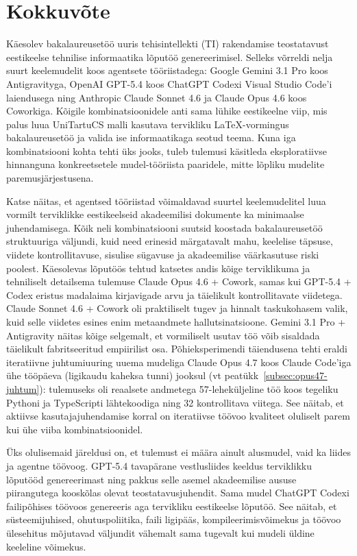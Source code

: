 \section{Kokkuvõte} \label{kokkuvote}

Käesolev bakalaureusetöö uuris tehisintellekti (TI) rakendamise teostatavust eestikeelse tehnilise informaatika lõputöö genereerimisel. Selleks võrreldi nelja suurt keelemudelit koos agentsete tööriistadega: Google Gemini 3.1 Pro koos Antigravityga, OpenAI GPT-5.4 koos ChatGPT Codexi Visual Studio Code'i laiendusega ning Anthropic Claude Sonnet 4.6 ja Claude Opus 4.6 koos Coworkiga. Kõigile kombinatsioonidele anti sama lühike eestikeelne viip, mis palus luua UniTartuCS malli kasutava tervikliku \LaTeX{}-vormingus bakalaureusetöö ja valida ise informaatikaga seotud teema. Kuna iga kombinatsiooni kohta tehti üks jooks, tuleb tulemusi käsitleda eksploratiivse hinnanguna konkreetsetele mudel-tööriista paaridele, mitte lõpliku mudelite paremusjärjestusena.

Katse näitas, et agentsed tööriistad võimaldavad suurtel keelemudelitel luua vormilt terviklikke eestikeelseid akadeemilisi dokumente ka minimaalse juhendamisega. Kõik neli kombinatsiooni suutsid koostada bakalaureusetöö struktuuriga väljundi, kuid need erinesid märgatavalt mahu, keelelise täpsuse, viidete kontrollitavuse, sisulise sügavuse ja akadeemilise väärkasutuse riski poolest. Käesolevas lõputöös tehtud katsetes andis kõige terviklikuma ja tehniliselt detailsema tulemuse Claude Opus 4.6 + Cowork, samas kui GPT-5.4 + Codex eristus madalaima kirjavigade arvu ja täielikult kontrollitavate viidetega. Claude Sonnet 4.6 + Cowork oli praktiliselt tugev ja hinnalt taskukohasem valik, kuid selle viidetes esines enim metaandmete hallutsinatsioone. Gemini 3.1 Pro + Antigravity näitas kõige selgemalt, et vormiliselt usutav töö võib sisaldada täielikult fabritseeritud empiirilist osa. Põhieksperimendi täiendusena tehti eraldi iteratiivne juhtumiuuring uuema mudeliga Claude Opus 4.7 koos Claude Code'iga ühe tööpäeva (ligikaudu kaheksa tunni) jooksul (vt peatükk~\ref{subsec:opus47-juhtum}): tulemuseks oli reaalsete andmetega 57-leheküljeline töö koos tegeliku Pythoni ja TypeScripti lähtekoodiga ning 32 kontrollitava viitega. See näitab, et aktiivse kasutajajuhendamise korral on iteratiivse töövoo kvaliteet oluliselt parem kui ühe viiba kombinatsioonidel.

Üks olulisemaid järeldusi on, et tulemust ei määra ainult alusmudel, vaid ka liides ja agentne töövoog. GPT-5.4 tavapärane vestlusliides keeldus terviklikku lõputööd genereerimast ning pakkus selle asemel akadeemilise aususe piirangutega kooskõlas olevat teostatavusjuhendit. Sama mudel ChatGPT Codexi failipõhises töövoos genereeris aga tervikliku eestikeelse lõputöö. See näitab, et süsteemijuhised, ohutuspoliitika, faili ligipääs, kompileerimisvõimekus ja töövoo ülesehitus mõjutavad väljundit vähemalt sama tugevalt kui mudeli üldine keeleline võimekus.

